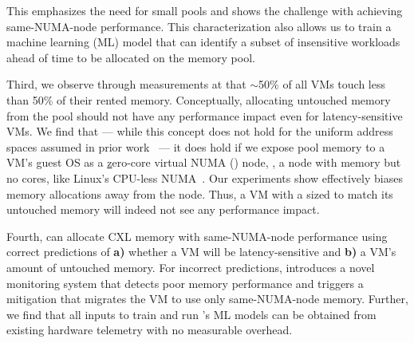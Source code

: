 This emphasizes the need for small pools and shows the challenge with achieving same-NUMA-node performance.
This characterization also allows us to train a machine learning (ML) model that can identify a subset of insensitive workloads ahead of time to be allocated on the \sys memory pool.

Third, we observe through measurements at \azure that $\sim$50\% of all VMs touch less than 50\% of their rented memory.
Conceptually, allocating untouched memory from the pool should not have any performance impact even for latency-sensitive VMs.
We find that --- while this concept does not hold for the uniform address spaces assumed in prior work~\cite{memblade.isca09, lim2011disaggregated, orchdisaggmem.tc20, sysdisaggmem.hpca12, nicpagefault.asplos17, aifm.osdi20, angel2020disaggregation} --- it does hold if we expose pool memory to a VM's guest OS as a {\underline{z}ero-core virtual NUMA ({\bf \cvn}) node}, \ie, a node with memory but no cores, like Linux's CPU-less NUMA~\cite{cpulessnuma.web19}.
Our experiments show \cvn effectively biases memory allocations away from the \cvn node.
Thus, a VM with a \cvn sized to match its untouched memory will indeed not see any performance impact.

Fourth, \sys can allocate CXL memory with same-NUMA-node performance using correct predictions of {\bf a)} whether a VM will be latency-sensitive and {\bf b)} a VM's amount of untouched memory.
For incorrect predictions, \sys introduces a novel monitoring system that detects poor memory performance and triggers a mitigation that migrates the VM to use only same-NUMA-node memory.
Further, we find that all inputs to train and run \sys's ML models can be obtained from existing hardware telemetry with no measurable overhead.

%

